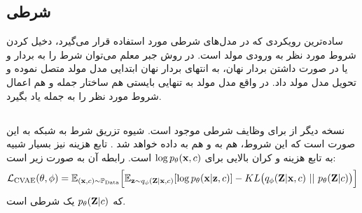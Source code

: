 \subsection{ شرطی}
ساده‌ترین رویکردی که در مدل‌های شرطی مورد استفاده قرار می‌گیرد، دخیل کردن شروط مورد نظر به ورودی مولد است. در روش جبر معلم می‌توان شرط را به بردار
و  یا در صورت داشتن بردار نهان، به انتهای بردار نهان ابتدایی مدل مولد متصل نموده و تحویل مدل مولد داد. در واقع مدل مولد به تنهایی بایستی هم ساختار جمله و هم اعمال شروط مورد نظر را به جمله یاد بگیرد.
\subsection{\cvae{}}
نسخه دیگر از \vae{} برای وظایف شرطی موجود است. شیوه تزریق شرط به شبکه به این صورت است که این شروط، هم به \encoder{} و هم به \decoder{} داده خواهد شد \cite{cvae, cvae_semi}. تابع هزینه نیز بسیار شبیه به تابع هزینه \vae{} و کران بالایی برای $\log p_\theta({\bf x},c)$ است. رابطه آن به صورت زیر است:
\begin{align}
	{\mathcal{L}}_\text{CVAE}(\theta, \phi) = \mathbb E_{({\bf x},c) \sim \mathbb P_\text{Data}} \Big[
		\mathbb E_{{\bf z} \sim q_\phi({\bf Z}|{\bf x}, c)} [\log p_\theta({\bf x}|{\bf z}, c)]
		- KL\big(q_\phi({\bf Z}|{\bf x},c) ~ || ~ p_\theta({\bf Z}|c) \big)
		\Big]
\end{align}
که $p_\theta({\bf Z}|c)$  یک \priordist{} شرطی است.

